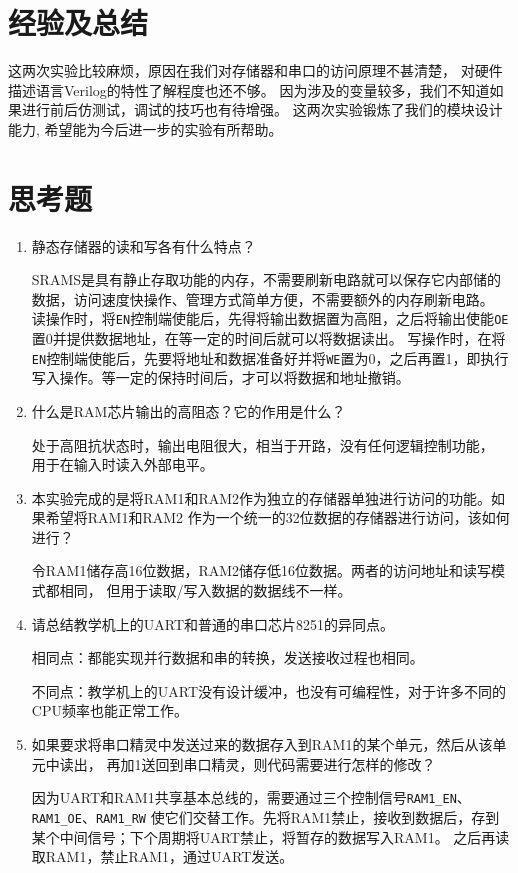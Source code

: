 \section{经验及总结}
这两次实验比较麻烦，原因在我们对存储器和串口的访问原理不甚清楚，
对硬件描述语言Verilog的特性了解程度也还不够。
因为涉及的变量较多，我们不知道如果进行前后仿测试，调试的技巧也有待增强。
这两次实验锻炼了我们的模块设计能力, 希望能为今后进一步的实验有所帮助。

\section{思考题}
\begin{enumerate}
  \item 静态存储器的读和写各有什么特点？

    SRAMS是具有静止存取功能的内存，不需要刷新电路就可以保存它内部储的数据，访问速度快操作、管理方式简单方便，不需要额外的内存刷新电路。
    读操作时，将\texttt{EN}控制端使能后，先得将输出数据置为高阻，之后将输出使能\texttt{OE}置0并提供数据地址，在等一定的时间后就可以将数据读出。
    写操作时，在将\texttt{EN}控制端使能后，先要将地址和数据准备好并将\texttt{WE}置为0，之后再置1，即执行写入操作。等一定的保持时间后，才可以将数据和地址撤销。

  \item 什么是RAM芯片输出的高阻态？它的作用是什么？

    处于高阻抗状态时，输出电阻很大，相当于开路，没有任何逻辑控制功能，
    用于在输入时读入外部电平。

  \item 本实验完成的是将RAM1和RAM2作为独立的存储器单独进行访问的功能。如果希望将RAM1和RAM2
    作为一个统一的32位数据的存储器进行访问，该如何进行？

    令RAM1储存高16位数据，RAM2储存低16位数据。两者的访问地址和读写模式都相同，
    但用于读取/写入数据的数据线不一样。

  \item 请总结教学机上的UART和普通的串口芯片8251的异同点。

    相同点：都能实现并行数据和串的转换，发送接收过程也相同。

    不同点：教学机上的UART没有设计缓冲，也没有可编程性，对于许多不同的CPU频率也能正常工作。

  \item 如果要求将串口精灵中发送过来的数据存入到RAM1的某个单元，然后从该单元中读出，
    再加1送回到串口精灵，则代码需要进行怎样的修改？

    因为UART和RAM1共享基本总线的，需要通过三个控制信号\texttt{RAM1\_EN}、\texttt{RAM1\_OE}、\texttt{RAM1\_RW}
    使它们交替工作。先将RAM1禁止，接收到数据后，存到某个中间信号；下个周期将UART禁止，将暂存的数据写入RAM1。
    之后再读取RAM1，禁止RAM1，通过UART发送。
\end{enumerate}


